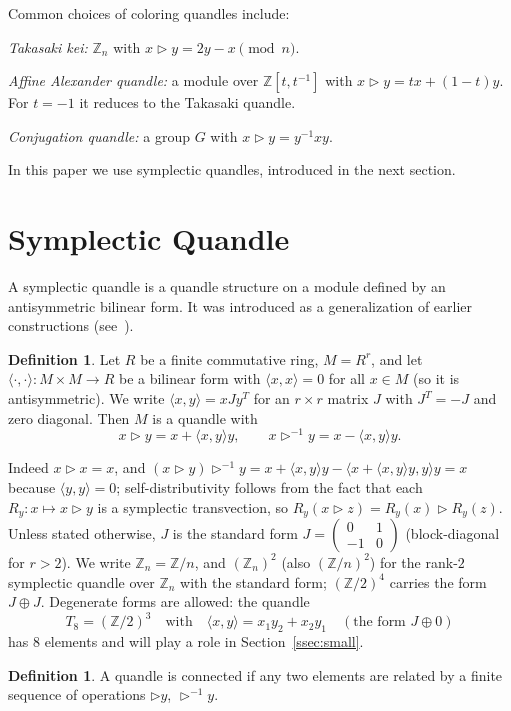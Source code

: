 \documentclass[11pt]{article}
\theoremstyle{definition}
\newtheorem{definition}[theorem]{Definition}
\newcommand{\Z}{\mathbb{Z}}
\newcommand{\tr}{\triangleright}
\newcommand{\tri}{\triangleright^{-1}}
\begin{document}
Common choices of coloring quandles include:

\noindent\emph{Takasaki kei:} $\Z_n$ with $x\tr y=2y-x \pmod n$.

\noindent\emph{Affine Alexander quandle:} a module over $\Z[t,t^{-1}]$ with $x\tr y=tx+(1-t)y$. For
$t=-1$ it reduces to the Takasaki quandle.

\noindent\emph{Conjugation quandle:} a group $G$ with $x\tr y=y^{-1}xy$.

In this paper we use symplectic quandles, introduced in the next section.

\section{Symplectic Quandle}\label{sec:symplectic}

A symplectic quandle is a quandle structure on a module defined by an antisymmetric bilinear form. It
was introduced as a generalization of earlier constructions (see~\cite{NN08,Yet03}).

\begin{definition}
Let $R$ be a finite commutative ring, $M=R^r$, and let $\langle\cdot,\cdot\rangle\colon M\times M\to R$ be
a bilinear form with $\langle x,x\rangle=0$ for all $x\in M$ (so it is antisymmetric). We write
$\langle x,y\rangle=xJy^T$ for an $r\times r$ matrix $J$ with $J^T=-J$ and zero diagonal. Then $M$ is a
quandle with
\[
x\tr y=x+\langle x,y\rangle y,\qquad x\tri y=x-\langle x,y\rangle y .
\]
\end{definition}

Indeed $x\tr x=x$, and $(x\tr y)\tri y=x+\langle x,y\rangle y-\langle x+\langle x,y\rangle y,y\rangle
y=x$ because $\langle y,y\rangle=0$; self-distributivity follows from the fact that each
$R_y\colon x\mapsto x\tr y$ is a symplectic transvection, so $R_y(x\tr z)=R_y(x)\tr R_y(z)$. Unless
stated otherwise, $J$ is the standard form
$J=\begin{pmatrix}0&1\\-1&0\end{pmatrix}$ (block-diagonal for $r>2$). We write $\Z_n=\Z/n$, and
$(\Z_n)^2$ (also $(\Z/n)^2$) for the rank-$2$ symplectic quandle over $\Z_n$ with the standard form;
$(\Z/2)^4$ carries the form $J\oplus J$. Degenerate forms are allowed: the quandle
\[
T_8=(\Z/2)^3\quad\text{with}\quad \langle x,y\rangle=x_1y_2+x_2y_1\quad(\text{the form }J\oplus0)
\]
has $8$ elements and will play a role in Section~\ref{ssec:small}.

\begin{definition}
A quandle is connected if any two elements are related by a finite sequence of operations $\tr y$,
$\tri y$.
\end{definition}
\end{document}
